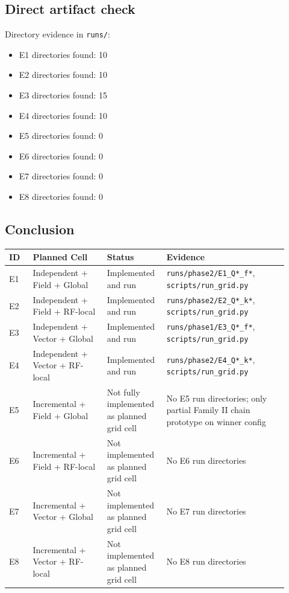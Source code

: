 \documentclass[11pt]{article}
\begin{document}
\subsection{Direct artifact check}
Directory evidence in \texttt{runs/}:
\begin{itemize}[leftmargin=*]
    \item E1 directories found: 10
    \item E2 directories found: 10
    \item E3 directories found: 15
    \item E4 directories found: 10
    \item E5 directories found: 0
    \item E6 directories found: 0
    \item E7 directories found: 0
    \item E8 directories found: 0
\end{itemize}

\subsection{Conclusion}
\begin{longtable}{>{\raggedright\arraybackslash}p{0.08\linewidth} >{\raggedright\arraybackslash}p{0.25\linewidth} >{\raggedright\arraybackslash}p{0.18\linewidth} >{\raggedright\arraybackslash}p{0.41\linewidth}}
\toprule
ID & Planned Cell & Status & Evidence \\
\midrule
E1 & Independent + Field + Global & Implemented and run & \texttt{runs/phase2/E1\_Q*\_f*}, \texttt{scripts/run\_grid.py} \\
E2 & Independent + Field + RF-local & Implemented and run & \texttt{runs/phase2/E2\_Q*\_k*}, \texttt{scripts/run\_grid.py} \\
E3 & Independent + Vector + Global & Implemented and run & \texttt{runs/phase1/E3\_Q*\_f*}, \texttt{scripts/run\_grid.py} \\
E4 & Independent + Vector + RF-local & Implemented and run & \texttt{runs/phase2/E4\_Q*\_k*}, \texttt{scripts/run\_grid.py} \\
E5 & Incremental + Field + Global & Not fully implemented as planned grid cell & No E5 run directories; only partial Family II chain prototype on winner config \\
E6 & Incremental + Field + RF-local & Not implemented as planned grid cell & No E6 run directories \\
E7 & Incremental + Vector + Global & Not implemented as planned grid cell & No E7 run directories \\
E8 & Incremental + Vector + RF-local & Not implemented as planned grid cell & No E8 run directories \\
\bottomrule
\end{longtable}
\end{document}
